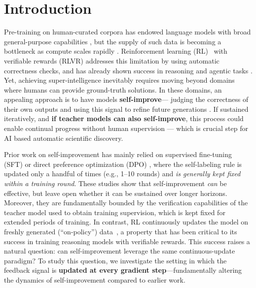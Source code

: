 \section{Introduction}

Pre-training on human-curated corpora has endowed language models with broad general-purpose capabilities \citep{brown2020language,rae2022scalinglanguagemodelsmethods}, but the supply of such data is becoming a bottleneck as compute scales rapidly \citep{hoffmann2022training,sevilla2022compute}. Reinforcement learning (RL)~\citep{sutton1998reinforcement} with verifiable rewards (RLVR) addresses this limitation by using automatic correctness checks, and has already shown success in reasoning and agentic tasks \citep{deepseekai2025deepseekr1incentivizingreasoningcapability,openai2024openaio1card}. Yet, achieving super-intelligence inevitably requires moving beyond domains where humans can provide ground-truth solutions. In these domains, an appealing approach is to have models \textbf{self-improve}— judging the correctness of their own outputs and using this signal to refine future generations \citep{zelikman2022star,song2025mind,huang2025selfimprovement}. If sustained iteratively, and \textbf{if teacher models can also self-improve}, this process could enable continual progress without human supervision — which is crucial step for AI based automatic scientific discovery.

Prior work on self-improvement has mainly relied on supervised fine-tuning (SFT) \citep{zelikman2022star,huang-etal-2023-large} or direct preference optimization (DPO) \citep{rafailov2024directpreferenceoptimizationlanguage,prasad2024selfconsistencypreferenceoptimization}, where the self-labeling rule is updated only a handful of times (e.g., 1–10 rounds) and \emph{is generally kept fixed within a training round}. These studies show that self-improvement \emph{can} be effective, but leave open whether it can be sustained over longer horizons. Moreover, they are fundamentally bounded by the verification capabilities of the teacher model used to obtain training supervision, which is kept fixed for extended periods of training. In contrast, RL continuously updates the model on freshly generated (``on-policy'') data~\citep{xu2024dposuperiorppollm,tajwar2024preferencefinetuningllmsleverage,lanchantin2025bridgingofflineonlinereinforcement}, a property that has been critical to its success in training reasoning models with verifiable rewards. This success raises a natural question: can self-improvement leverage the same continuous-update paradigm? To study this question, we investigate the setting in which the feedback signal is \textbf{updated at every gradient step}—fundamentally altering the dynamics of self-improvement compared to earlier work.


